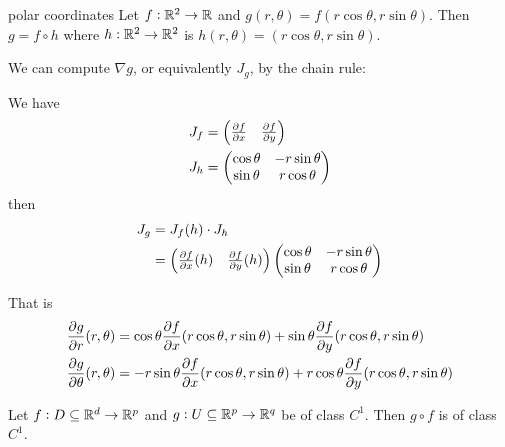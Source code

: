 \documentclass[12pt]{extarticle}
\begin{document}
\begin{example}{polar coordinates}
    Let $f: \mathbb{R}^2 \to \mathbb{R}$ and $g(r, \theta) = f(r \cos \theta, r \sin \theta)$.
    Then $g = f \circ h$ where $h: \mathbb{R}^2 \to \mathbb{R}^2$ is $h(r, \theta) = (r \cos \theta, r \sin \theta)$.

    We can compute $\nabla g$, or equivalently $J_g$, by the chain rule:

    We have
    \begin{align}
        J_f & = \begin{pmatrix}
                    \pdv{f}{x}() & \pdv{f}{y}()
                \end{pmatrix}  \\
        J_h & = \begin{pmatrix}
                    \cos \theta & -r \sin \theta \\
                    \sin \theta & r \cos \theta
                \end{pmatrix}
    \end{align}
    then
    \begin{align}
        J_g & = J_f(h) \cdot J_h                  \\
            & = \begin{pmatrix}
                    \pdv{f}{x}()(h) & \pdv{f}{y}()(h)
                \end{pmatrix}
        \begin{pmatrix}
            \cos \theta & -r \sin \theta \\
            \sin \theta & r \cos \theta
        \end{pmatrix}
    \end{align}

    That is
    \begin{align}
        \pdv{g}{r}()(r, \theta)      & = \cos \theta \pdv{f}{x}()(r \cos \theta, r \sin \theta) + \sin \theta \pdv{f}{y}()(r \cos \theta, r \sin \theta)      \\
        \pdv{g}{\theta}()(r, \theta) & = -r \sin \theta \pdv{f}{x}()(r \cos \theta, r \sin \theta) + r \cos \theta \pdv{f}{y}()(r \cos \theta, r \sin \theta)
    \end{align}

\end{example}

\begin{proposition}
    Let $f: D \subseteq \mathbb{R}^d \to \mathbb{R}^p$ and $g: U \subseteq \mathbb{R}^p \to \mathbb{R}^q$ be of class $C^1$.
    Then $g \circ f$ is of class $C^1$.
\end{proposition}
\end{document}

